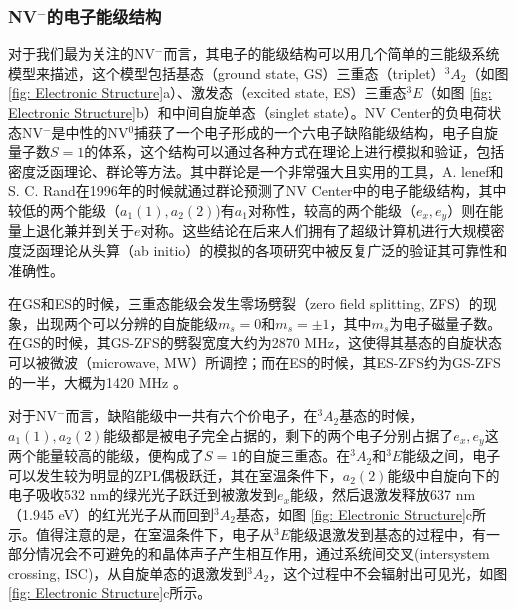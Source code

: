 \documentclass[type = bachelor]{whu-thesis}
\begin{document}
\subsubsection{NV$^-$的电子能级结构}
对于我们最为关注的NV$^-$而言，其电子的能级结构可以用几个简单的三能级系统模型来描述，这个模型包括基态（ground state, GS）三重态（triplet）$^3A_2$（如图 \ref{fig: Electronic Structure}a）、激发态（excited state, ES）三重态$^3E$（如图 \ref{fig: Electronic Structure}b）和中间自旋单态（singlet state）。NV Center的负电荷状态NV$^-$是中性的NV$^0$捕获了一个电子形成的一个六电子缺陷能级结构，电子自旋量子数$S=1$的体系，这个结构可以通过各种方式在理论上进行模拟和验证，包括密度泛函理论、群论等方法\cite{lenef1996electronic,goss1997comment, maze2011properties, hossain2008ab, gali2009theory}。其中群论是一个非常强大且实用的工具，A. lenef和S. C. Rand在1996年的时候就通过群论预测了NV Center中的电子能级结构，其中较低的两个能级（$a_1(1), a_2(2)$)有$a_1$对称性，较高的两个能级（$e_x, e_y$）则在能量上退化兼并到关于$e$对称\cite{lenef1996electronic}。这些结论在后来人们拥有了超级计算机进行大规模密度泛函理论从头算（ab initio）的模拟的各项研究中被反复广泛的验证其可靠性和准确性\cite{gali2009theory, zou2023influence}。

在GS和ES的时候，三重态能级会发生零场劈裂（zero field splitting, ZFS）的现象，出现两个可以分辨的自旋能级$m_s=0$和$m_s=±1$，其中$m_s$为电子磁量子数。在GS的时候，其GS-ZFS的劈裂宽度大约为2870 \unit{\MHz}，这使得其基态的自旋状态可以被微波（microwave, MW）所调控；而在ES的时候，其ES-ZFS约为GS-ZFS的一半，大概为1420 \unit{\MHz} \cite{gruber1997scanning,neumann2009excited}。

对于NV$^-$而言，缺陷能级中一共有六个价电子，在$^3A_2$基态的时候，$a_1(1), a_2(2)$能级都是被电子完全占据的，剩下的两个电子分别占据了$e_x, e_y$这两个能量较高的能级，便构成了$S=1$的自旋三重态。在$^3A_2$和$^3E$能级之间，电子可以发生较为明显的ZPL偶极跃迁，其在室温条件下，$a_2(2)$能级中自旋向下的电子吸收532 nm的绿光光子跃迁到被激发到$e_x$能级，然后退激发释放637 nm （1.945 \unit{\eV}）的红光光子从而回到$^3A_2$基态，如图 \ref{fig: Electronic Structure}c所示。值得注意的是，在室温条件下，电子从$^3E$能级退激发到基态的过程中，有一部分情况会不可避免的和晶体声子产生相互作用，通过系统间交叉(intersystem crossing, ISC)，从自旋单态的退激发到$^3A_2$，这个过程中不会辐射出可见光，如图 \ref{fig: Electronic Structure}c所示。
\end{document}
